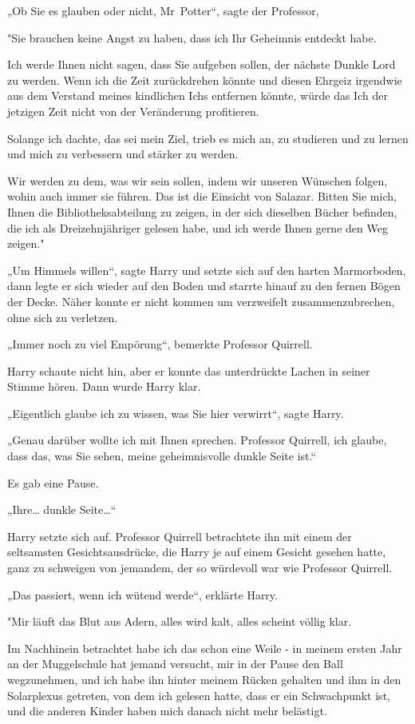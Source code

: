 {„Ob Sie es glauben oder nicht, Mr~Potter“, sagte der Professor,

"Sie brauchen keine Angst zu haben, dass ich Ihr Geheimnis entdeckt habe.

Ich werde Ihnen nicht sagen, dass Sie aufgeben sollen, der nächste Dunkle Lord zu werden. Wenn ich die Zeit zurückdrehen könnte und diesen Ehrgeiz irgendwie aus dem Verstand meines kindlichen Ichs entfernen könnte, würde das Ich der jetzigen Zeit nicht von der Veränderung profitieren.

Solange ich dachte, das sei mein Ziel, trieb es mich an, zu studieren und zu lernen und mich zu verbessern und stärker zu werden.

Wir werden zu dem, was wir sein sollen, indem wir unseren Wünschen folgen, wohin auch immer sie führen. Das ist die Einsicht von Salazar. Bitten Sie mich, Ihnen die Bibliotheksabteilung zu zeigen, in der sich dieselben Bücher befinden, die ich als Dreizehnjähriger gelesen habe, und ich werde Ihnen gerne den Weg zeigen."

„Um Himmels willen“, sagte Harry und setzte sich auf den harten Marmorboden, dann legte er sich wieder auf den Boden und starrte hinauf zu den fernen Bögen der Decke. Näher konnte er nicht kommen um verzweifelt zusammenzubrechen, ohne sich zu verletzen.

„Immer noch zu viel Empörung“, bemerkte Professor Quirrell.

Harry schaute nicht hin, aber er konnte das unterdrückte Lachen in seiner Stimme hören. Dann wurde Harry klar.

„Eigentlich glaube ich zu wissen, was Sie hier verwirrt“, sagte Harry.

„Genau darüber wollte ich mit Ihnen sprechen. Professor Quirrell, ich glaube, dass das, was Sie sehen, meine geheimnisvolle dunkle Seite ist.“

Es gab eine Pause.

„Ihre… dunkle Seite…“

Harry setzte sich auf. Professor Quirrell betrachtete ihn mit einem der seltsamsten Gesichtsausdrücke, die Harry je auf einem Gesicht gesehen hatte, ganz zu schweigen von jemandem, der so würdevoll war wie Professor Quirrell.

„Das passiert, wenn ich wütend werde“, erklärte Harry.

"Mir läuft das Blut aus Adern, alles wird kalt, alles scheint völlig klar.

Im Nachhinein betrachtet habe ich das schon eine Weile - in meinem ersten Jahr an der Muggelschule hat jemand versucht, mir in der Pause den Ball wegzunehmen, und ich habe ihn hinter meinem Rücken gehalten und ihm in den Solarplexus getreten, von dem ich gelesen hatte, dass er ein Schwachpunkt ist, und die anderen Kinder haben mich danach nicht mehr belästigt.

}
